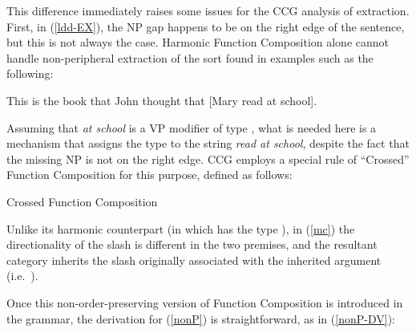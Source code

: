\documentclass[output=paper
                ,modfonts
 	        ,biblatex
                ,babelshorthands
                ,newtxmath
                ,draftmode
                ,colorlinks, citecolor=brown
]{langscibook}
\begin{document}
This difference immediately raises some issues for the CCG analysis of
extraction. First, in (\ref{ldd-EX}), the NP gap happens to be on the right
edge of the sentence, but this is not always the  case. Harmonic
Function Composition alone cannot  handle non-peripheral
extraction of the sort found in examples such as the following:

\begin{exe}
 \ex\label{nonP}
  This is the book that John thought that [Mary read {\trace}\xspace at school].
\end{exe}
Assuming that  \textit{at school} is a VP modifier of type ,
what is needed here is a mechanism that assigns the type 
to the string \textit{read {\trace}\xspace at school}, despite the
fact that  the missing NP is not  
on the right edge. CCG employs a special  rule of ``Crossed'' Function
Composition for this purpose, defined as follows:

\begin{exe}
 \ex\label{mc}
  Crossed Function Composition\\[.5\baselineskip]
\attop{\begin{prooftree}
\hypo{\LexEnt{\pt{\ptv{a}}}{\sem{ \sG}}{\syncat{\textit{A}\ensuremath{/}\textit{B}}}}
\hypo{\LexEnt{\pt{\ptv{b}}}{\sem{ \sF}}{\syncat{\textit{A}\ensuremath{\backslash}{}\textit{C}}}}
\infer2[xFC]{\LexEnt{\pt{\ptv{a} \ensuremath{\circ}\xspace \ptv{b}}}{\sem{ \lambda x. \sF(\sG(x))}}{\syncat{\textit{C}\ensuremath{/}\textit{B}}}}
\end{prooftree}}
\end{exe}
Unlike its harmonic counterpart (in which  has the type
), in (\ref{mc})
the directionality of the slash is different 
in the two premises, and the resultant category inherits the
slash originally associated with the inherited argument 
(i.e.\ ).

Once this non-order-preserving version of Function Composition is 
introduced in the grammar, the derivation for (\ref{nonP}) is
straightforward, as in (\ref{nonP-DV}):
\end{document}
